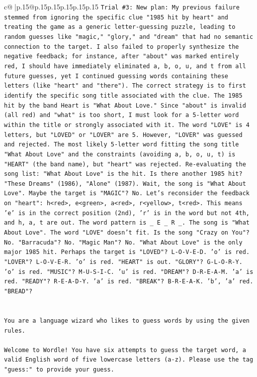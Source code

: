 \documentclass{article}
\begin{document}
{\begin{supertabular}{c@{$\;$}|p{.15\linewidth}@{}p{.15\linewidth}p{.15\linewidth}p{.15\linewidth}p{.15\linewidth}p{.15\linewidth}}
{{{\texttt{Trial \#3: New plan: My previous failure stemmed from ignoring the specific clue "1985 hit by heart" and treating the game as a generic letter{-}guessing puzzle, leading to random guesses like "magic," "glory," and "dream" that had no semantic connection to the target. I also failed to properly synthesize the negative feedback; for instance, after "about" was marked entirely red, I should have immediately eliminated a, b, o, u, and t from all future guesses, yet I continued guessing words containing these letters (like "heart" and "there"). The correct strategy is to first identify the specific song title associated with the clue. The 1985 hit by the band Heart is "What About Love." Since "about" is invalid (all red) and "what" is too short, I must look for a 5{-}letter word within the title or strongly associated with it. The word "LOVE" is 4 letters, but "LOVED" or "LOVER" are 5. However, "LOVER" was guessed and rejected. The most likely 5{-}letter word fitting the song title "What About Love" and the constraints (avoiding a, b, o, u, t) is "HEART" (the band name), but "heart" was rejected. Re{-}evaluating the song list: "What About Love" is the hit. Is there another 1985 hit? "These Dreams" (1986), "Alone" (1987). Wait, the song is "What About Love". Maybe the target is "MAGIC"? No. Let's reconsider the feedback on "heart": h<red>, e<green>, a<red>, r<yellow>, t<red>. This means 'e' is in the correct position (2nd), 'r' is in the word but not 4th, and h, a, t are out. The word pattern is \_ E \_ R \_. The song is "What About Love". The word "LOVE" doesn't fit. Is the song "Crazy on You"? No. "Barracuda"? No. "Magic Man"? No. "What About Love" is the only major 1985 hit. Perhaps the target is "LOVED"? L{-}O{-}V{-}E{-}D. 'o' is red. "LOVER"? L{-}O{-}V{-}E{-}R. 'o' is red. "HEART" is out. "GLORY"? G{-}L{-}O{-}R{-}Y. 'o' is red. "MUSIC"? M{-}U{-}S{-}I{-}C. 'u' is red. "DREAM"? D{-}R{-}E{-}A{-}M. 'a' is red. "READY"? R{-}E{-}A{-}D{-}Y. 'a' is red. "BREAK"? B{-}R{-}E{-}A{-}K. 'b', 'a' red. "BREAD"?} \\
\\ 
\\ 
\texttt{You are a language wizard who likes to guess words by using the given rules.} \\
\\ 
\texttt{Welcome to Wordle! You have six attempts to guess the target word, a valid English word of five lowercase letters (a{-}z). Please use the tag "guess:" to provide your guess.} \\
\\ 
}}}
\end{supertabular}}
\end{document}
